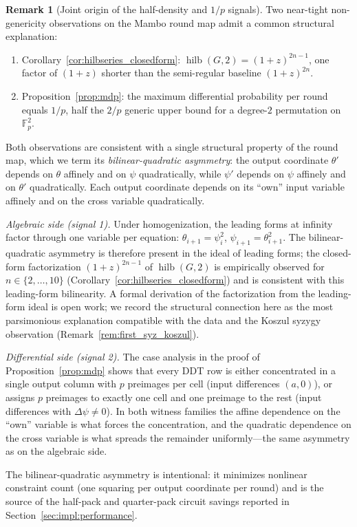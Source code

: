 \documentclass[11pt,a4paper]{article}
\theoremstyle{definition}
\newtheorem{remark}[theorem]{Remark}
\newcommand{\Fp}{\mathbb{F}_p}
\begin{document}
\begin{remark}[Joint origin of the half-density and $1/p$ signals]\label{rem:joint_signal}
Two near-tight non-genericity observations on the Mambo round map admit a
common structural explanation:
\begin{enumerate}[nosep]
  \item Corollary~\ref{cor:hilbseries_closedform}:
    $\operatorname{hilb}(G,2) = (1+z)^{2n-1}$, one factor of $(1+z)$ shorter
    than the semi-regular baseline $(1+z)^{2n}$.
  \item Proposition~\ref{prop:mdp}: the maximum differential
    probability per round equals $1/p$, half the $2/p$ generic upper bound
    for a degree-$2$ permutation on~$\Fp^2$.
\end{enumerate}
Both observations are consistent with a single structural property of the
round map, which we term its \emph{bilinear-quadratic asymmetry}: the
output coordinate $\theta'$ depends on $\theta$ affinely and on $\psi$
quadratically, while $\psi'$ depends on $\psi$ affinely and on $\theta'$
quadratically. Each output coordinate depends on its ``own'' input
variable affinely and on the cross variable quadratically.

\emph{Algebraic side (signal 1).} Under homogenization, the leading forms
at infinity factor through one variable per equation: $\theta_{i+1} =
\psi_i^2$, $\psi_{i+1} = \theta_{i+1}^2$. The bilinear-quadratic asymmetry
is therefore present in the ideal of leading forms; the closed-form
factorization $(1+z)^{2n-1}$ of $\operatorname{hilb}(G,2)$ is empirically
observed for $n \in \{2,\dots,10\}$ (Corollary~\ref{cor:hilbseries_closedform})
and is consistent with this leading-form bilinearity. A formal derivation
of the factorization from the leading-form ideal is open work; we record
the structural connection here as the most parsimonious explanation
compatible with the data and the Koszul syzygy observation
(Remark~\ref{rem:first_syz_koszul}).

\emph{Differential side (signal 2).} The case analysis in the proof of
Proposition~\ref{prop:mdp} shows that every DDT row is either
concentrated in a single output column with $p$ preimages per cell
(input differences $(a, 0)$), or assigns $p$ preimages to exactly one
cell and one preimage to the rest (input differences with
$\Delta\psi \ne 0$). In both witness families the affine dependence on
the ``own'' variable is what forces the concentration, and the
quadratic dependence on the cross variable is what spreads the
remainder uniformly---the same asymmetry as on the algebraic side.

The bilinear-quadratic asymmetry is intentional: it minimizes nonlinear
constraint count (one squaring per output coordinate per round) and is
the source of the half-pack and quarter-pack circuit savings reported in
Section~\ref{sec:impl:performance}.
\end{remark}
\end{document}
